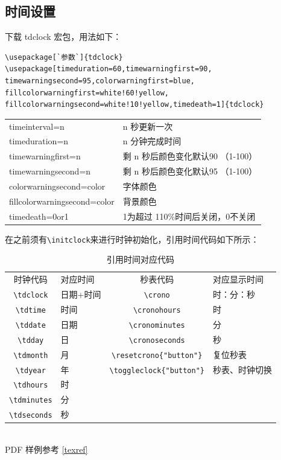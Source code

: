 \subsection{时间设置}




下载 tdclock 宏包，用法如下：
\begin{lstlisting}[language={[LaTeX]TeX}]
\usepackage[`参数`]{tdclock}
\usepackage[timeduration=60,timewarningfirst=90,
timewarningsecond=95,colorwarningfirst=blue,
fillcolorwarningfirst=white!60!yellow,
fillcolorwarningsecond=white!10!yellow,timedeath=1]{tdclock}
\end{lstlisting}
\begin{tabular}{ll}
  timeinterval=n & n 秒更新一次 \\
  timeduration=n & n 分钟完成时间 \\
  timewarningfirst=n & 剩 n 秒后颜色变化默认90 （1-100）\\
  timewarningsecond=n & 剩 n 秒后颜色变化默认95 （1-100）\\
  colorwarningsecond=color  & 字体颜色 \\
  fillcolorwarningsecond=color & 背景颜色 \\
  timedeath=0or1 & 1为超过 110\%时间后关闭，0不关闭 \\
\end{tabular}



在之前须有\verb|\initclock|来进行时钟初始化，引用时间代码如下所示：\\
\begin{table}[ht]
\caption{引用时间对应代码} \centering
{}
\begin{tabular}{clcl}
\toprule
时钟代码 & 对应时间 & 秒表代码 & 对应显示时间\\
  \verb|\tdclock| & 日期+时间 & \verb|\crono| & 时：分：秒 \\
  \verb|\tdtime| & 时间 & \verb|\cronohours| & 时 \\
  \verb|\tddate| & 日期 & \verb|\cronominutes| & 分 \\
  \verb|\tdday| & 日 &  \verb|\cronoseconds| & 秒  \\
  \verb|\tdmonth| & 月 & \verb|\resetcrono{"button"}| & 复位秒表 \\
  \verb|\tdyear| & 年 & \verb|\toggleclock{"button"}|& 秒表、时钟切换\\
  \verb|\tdhours| & 时 && \\
  \verb|\tdminutes| & 分 && \\
  \verb|\tdseconds| & 秒 && \\
  \bottomrule
\end{tabular}
\end{table}
~\\
PDF 样例参考 \ref{texref}\\


